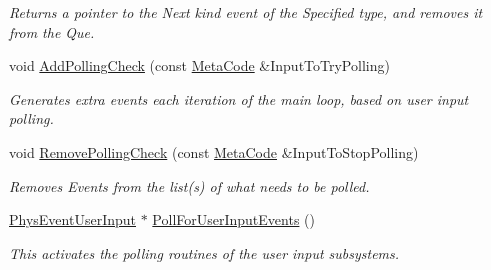\begin{DoxyCompactItemize}
\begin{DoxyCompactList}\small\item\em Returns a pointer to the Next kind event of the Specified type, and removes it from the Que. \item\end{DoxyCompactList}\item 
void \hyperlink{classphys_1_1EventManager_a6ff66883358344908afd11204f79f196}{AddPollingCheck} (const \hyperlink{classphys_1_1MetaCode}{MetaCode} \&InputToTryPolling)
\begin{DoxyCompactList}\small\item\em Generates extra events each iteration of the main loop, based on user input polling. \item\end{DoxyCompactList}\item 
void \hyperlink{classphys_1_1EventManager_adaf7d5346932506ed43f893eb071fd39}{RemovePollingCheck} (const \hyperlink{classphys_1_1MetaCode}{MetaCode} \&InputToStopPolling)
\begin{DoxyCompactList}\small\item\em Removes Events from the list(s) of what needs to be polled. \item\end{DoxyCompactList}\item 
\hyperlink{classPhysEventUserInput}{PhysEventUserInput} $\ast$ \hyperlink{classphys_1_1EventManager_aaa38d44f9fad236d68c66249428cc164}{PollForUserInputEvents} ()
\begin{DoxyCompactList}\small\item\em This activates the polling routines of the user input subsystems. \item\end{DoxyCompactList}\end{DoxyCompactItemize}


